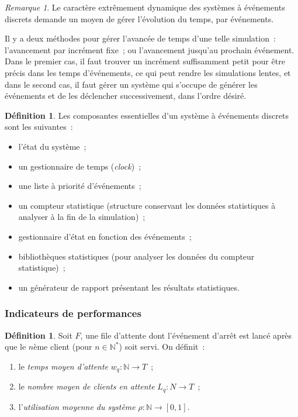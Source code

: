 \documentclass{article}
\theoremstyle{definition}
\newtheorem{déf}[thm]{Définition}
\theoremstyle{remark}
\newtheorem*{rmq}{Remarque}
\newcommand{\N}{\mathbb N}
\begin{document}
	\begin{rmq} Le caractère extrêmement dynamique des systèmes à événements discrets demande un moyen de gérer l'évolution du temps, par événements.

	Il y a deux méthodes pour gérer l'avancée de temps d'une telle simulation~: l'avancement par incrément fixe~; ou l'avancement jusqu'au prochain événement.
	Dans le premier cas, il faut trouver un incrément suffisamment petit pour être précis dans les temps d'événements, ce qui peut rendre les simulations lentes,
	et dans le second cas, il faut gérer un système qui s'occupe de générer les événements et de les déclencher successivement, dans l'ordre désiré.
	\end{rmq}

	\begin{déf} Les composantes essentielles d'un système à événements discrets sont les suivantes~:
	\begin{itemize}
		\item l'état du système~;
		\item un gestionnaire de temps (\textit{clock})~;
		\item une liste à priorité d'événements~;
		\item un compteur statistique (structure conservant les données statistiques à analyser à la fin de la simulation)~;
		\item gestionnaire d'état en fonction des événements~;
		\item bibliothèques statistiques (pour analyser les données du compteur statistique)~;
		\item un générateur de rapport présentant les résultats statistiques.
	\end{itemize}
	\end{déf}

		\subsubsection{Indicateurs de performances}

	\begin{déf} Soit $F$, une file d'attente dont l'événement d'arrêt est lancé après que le $n$ème client (pour $n \in \N^*$) soit servi. On définit~:
	\begin{enumerate}
		\item le \textit{temps moyen d'attente} $w_q : \N \to T$~;
		\item le \textit{nombre moyen de clients en attente} $L_q : N \to T$~;
		\item l'\textit{utilisation moyenne du système} $\rho : \N \to [0, 1]$.
	\end{enumerate}
	\end{déf}
\end{document}
